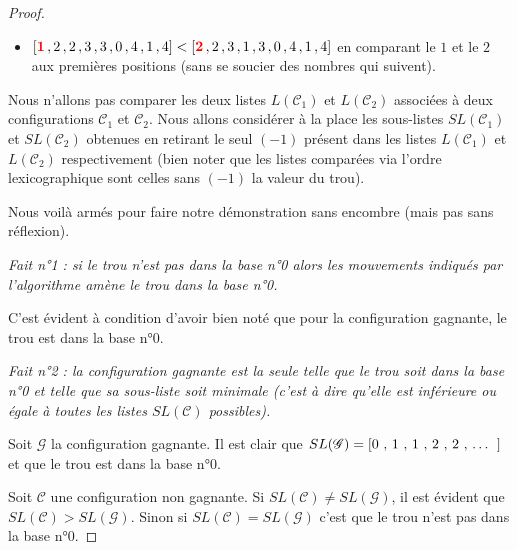 \begin{proof}
\begin{itemize}
		\medskip

		\item[\textbullet] $[\text{\color{red} \textbf{1}} \, , 2 \, , 2 \, , 3 \, , 3 \, , 0 \, , 4 \, , 1 \, , 4] < [\text{\color{red} \textbf{2}} \, , 2 \, , 3 \, , 1 \, , 3 \, , 0 \, , 4 \, , 1 \, , 4]$
		en comparant le $1$ et le $2$ aux premières positions (sans se soucier des nombres qui suivent).
	\end{itemize}


	\medskip

	Nous n'allons pas comparer les deux listes $L(\mathscr{C}_1)$ et $L(\mathscr{C}_2)$ associées à deux configurations $\mathscr{C}_1$ et $\mathscr{C}_2$. Nous allons considérer à la place les sous-listes $SL(\mathscr{C}_1)$ et $SL(\mathscr{C}_2)$ obtenues en retirant le seul $(-1)$ présent dans les listes $L(\mathscr{C}_1)$ et $L(\mathscr{C}_2)$ respectivement (bien noter que les listes comparées via l'ordre lexicographique sont celles sans $(-1)$ la valeur du trou).
		
	
	\medskip

	Nous voilà armés pour faire notre démonstration sans encombre (mais pas sans réflexion).


	\medskip

	\textit{Fait n°1 : si le trou n'est pas dans la base n°0 alors les mouvements indiqués par l'algorithme amène le trou dans la base n°0.}


	\medskip
	
	C'est évident à condition d'avoir bien noté que pour la configuration gagnante, le trou est dans la base n°0.


	\medskip

	\textit{Fait n°2 : la configuration gagnante est la seule telle que le trou soit dans la base n°0 et telle que sa sous-liste soit minimale (c'est à dire qu'elle est inférieure ou égale à toutes les listes $SL(\mathscr{C})$ possibles).}


	\medskip

	Soit $\mathscr{G}$ la configuration gagnante. Il est clair que
	$SL(\mathscr{G}) = \text{[0 , 1 , 1 , 2 , 2 , \dots{} ]}$
	et que le trou est dans la base n°0.


	\medskip

	Soit $\mathscr{C}$ une configuration non gagnante. Si $SL(\mathscr{C}) \neq SL(\mathscr{G})$, il est évident que $SL(\mathscr{C}) > SL(\mathscr{G})$. Sinon si $SL(\mathscr{C}) = SL(\mathscr{G})$ c'est que le trou n'est pas dans la base n°0.
	
	
	\medskip


\end{proof}
